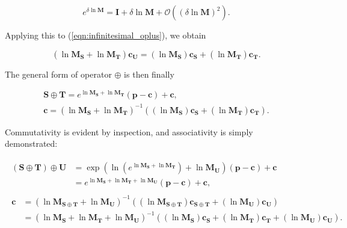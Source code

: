         \begin{equation}
          e^{\delta \ln \mathbf{M}} = \mathbf{I} + \delta \ln \mathbf{M} + \mathcal{O}((\delta \ln \mathbf{M})^2).
        \end{equation}
        
        Applying this to (\ref{eqn:infinitesimal_oplus}), we obtain
        
        \begin{equation}
          (\ln\mathbf{M_S} + \ln\mathbf{M_T})\mathbf{c_U} = (\ln\mathbf{M_S})\mathbf{c_S} + (\ln\mathbf{M_T})\mathbf{c_T}.
        \end{equation}
        
        The general form of operator $\oplus$ is then finally
        
        \begin{gather}
          \mathbf{S} \oplus \mathbf{T} = e^{\ln\mathbf{M_S} + \ln\mathbf{M_T}}(\mathbf{p} - \mathbf{c}) + \mathbf{c}, \nonumber \\
          \mathbf{c} = (\ln\mathbf{M_S} + \ln\mathbf{M_T})^{-1}((\ln\mathbf{M_S})\mathbf{c_S} + (\ln\mathbf{M_T})\mathbf{c_T}). \label{eqn:affine_oplus}
        \end{gather}
        
        Commutativity is evident by inspection, and associativity is simply demonstrated:
        
        \begin{gather}
          \begin{split}
            (\mathbf{S} \oplus \mathbf{T}) \oplus \mathbf{U} &= \exp(\ln(e^{\ln\mathbf{M_S} + \ln\mathbf{M_T}}) + \ln\mathbf{M_U})(\mathbf{p} - \mathbf{c}) + \mathbf{c} \\
                                                             &= e^{\ln\mathbf{M_S} + \ln\mathbf{M_T} + \ln\mathbf{M_U}}(\mathbf{p} - \mathbf{c}) + \mathbf{c},
          \end{split} \\
          \begin{split}
            \mathbf{c} &= (\ln\mathbf{M_{S \oplus T}} + \ln\mathbf{M_U})^{-1}((\ln\mathbf{M_{S \oplus T}})\mathbf{c_{S \oplus T}} + (\ln\mathbf{M_U})\mathbf{c_U}) \\
                       &= (\ln\mathbf{M_S} + \ln\mathbf{M_T} + \ln\mathbf{M_U})^{-1}((\ln\mathbf{M_S})\mathbf{c_S} + (\ln\mathbf{M_T})\mathbf{c_T} + (\ln\mathbf{M_U})\mathbf{c_U}).
          \end{split}
        \end{gather}
        
